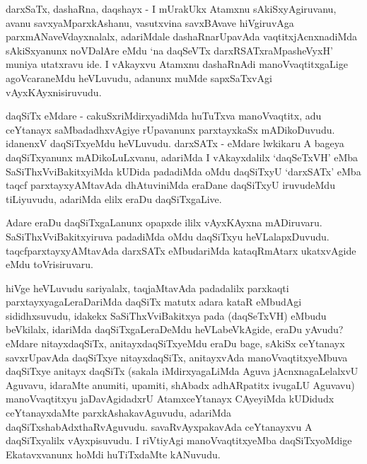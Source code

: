 \begin{artha}
darxSaTx, dashaRna, daqshayx - I mUrakUkx Atamxnu sAkiSxyAgiruvanu, avanu savxyaMparxkAshanu, vasutxvina savxBAvave hiVgiruvAga parxmANaveVdayxnalalx, adariMdale dashaRnarUpavAda vaqtitxjAcnxnadiMda sAkiSxyanunx noVDalAre eMdu `na daqSeVTx darxRSATxraMpasheVyxH' muniya utatxravu ide. I vAkayxvu Atamxnu dashaRnAdi manoVvaqtitxgaLige agoVcaraneMdu heVLuvudu, adanunx muMde sapxSaTxvAgi vAyxKAyxnisiruvudu.
\end{artha}


\begin{artha}
daqSiTx eMdare - cakuSxriMdirxyadiMda huTuTxva manoVvaqtitx, adu ceYtanayx saMbadadhxvAgiye rUpavanunx parxtayxkaSx mADikoDuvudu. idanenxV daqSiTxyeMdu heVLuvudu. darxSATx - eMdare lwkikaru A bageya daqSiTxyanunx mADikoLuLxvanu, adariMda I vAkayxdalilx `daqSeTxVH' eMba SaSiThxVviBakitxyiMda kUDida padadiMda oMdu daqSiTxyU `darxSATx' eMba taqcf parxtayxyAMtavAda dhAtuviniMda eraDane daqSiTxyU iruvudeMdu tiLiyuvudu, adariMda elilx eraDu daqSiTxgaLive.
\end{artha}


\begin{artha}
Adare eraDu daqSiTxgaLanunx opapxde ililx vAyxKAyxna mADiruvaru. SaSiThxVviBakitxyiruva padadiMda oMdu daqSiTxyu heVLalapxDuvudu. taqcfparxtayxyAMtavAda darxSATx eMbudariMda kataqRmAtarx ukatxvAgide eMdu toVrisiruvaru.
\end{artha}


\begin{artha}
hiVge heVLuvudu sariyalalx, taqjaMtavAda padadalilx parxkaqti parxtayxyagaLeraDariMda daqSiTx matutx adara kataR eMbudAgi sididhxsuvudu, idakekx SaSiThxVviBakitxya pada (daqSeTxVH) eMbudu beVkilalx, idariMda daqSiTxgaLeraDeMdu heVLabeVkAgide, eraDu yAvudu? eMdare nitayxdaqSiTx, anitayxdaqSiTxyeMdu eraDu bage, sAkiSx ceYtanayx savxrUpavAda daqSiTxye nitayxdaqSiTx, anitayxvAda manoVvaqtitxyeMbuva daqSiTxye anitayx daqSiTx (sakala iMdirxyagaLiMda Aguva jAcnxnagaLelalxvU Aguvavu, idaraMte anumiti, upamiti, shAbadx adhARpatitx ivugaLU Aguvavu) manoVvaqtitxyu jaDavAgidadxrU AtamxceYtanayx CAyeyiMda kUDidudx ceYtanayxdaMte parxkAshakavAguvudu, adariMda daqSiTxshabAdxthaRvAguvudu. savaRvAyxpakavAda ceYtanayxvu A daqSiTxyalilx vAyxpisuvudu. I riVtiyAgi manoVvaqtitxyeMba daqSiTxyoMdige Ekatavxvanunx hoMdi huTiTxdaMte kANuvudu.
\end{artha}

